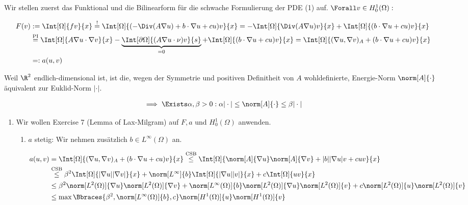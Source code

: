 \begin{solution}

Wir stellen zuerst das Funktional und die Bilinearform für die schwache Formulierung der PDE (1) auf.
$\Forall v \in H_0^1(\Omega):$

\begin{align*}
  F(v)
  & :=
  \Int[\Omega]{f v}{x}
  \stackrel{!}{=}
  \Int[\Omega]{(-\Div(A \nabla u) + b \cdot \nabla u + c u) v}{x}
  =
  -\Int[\Omega]{\Div(A \nabla u) v}{x}
  +
  \Int[\Omega]{(b \cdot \nabla u + c u) v}{x} \\
  & \stackrel
  {
    \mathrm{PI}
  }{=}
  \Int[\Omega]{A \nabla u \cdot \nabla v}{x}
  -
  \underbrace
  {
    \Int[\partial \Omega]{(A \nabla u \cdot \nu) v}{s}
  }_{=0}
  +
  \Int[\Omega]{(b \cdot \nabla u + c u) v}{x}
  =
  \Int[\Omega]{(\nabla u, \nabla v)_A + (b \cdot \nabla u + c u) v}{x} \\
  & =:
  a(u, v)
\end{align*}

Weil $\R^2$ endlich-dimensional ist, ist die, wegen der Symmetrie und positiven Definitheit von $A$ wohldefinierte, Energie-Norm $\norm[A]{\cdot}$ äquivalent zur Euklid-Norm $|\cdot|$.

\begin{align*}
  \implies
  \Exists \alpha, \beta > 0:
  \alpha |\cdot| \leq \norm[A]{\cdot} \leq \beta |\cdot|
\end{align*}

\begin{enumerate}[label = \textbf{\alph*)}]

  \item Wir wollen Exercise 7 (Lemma of Lax-Milgram) auf $F, a$ und $H_0^1(\Omega)$ anwenden.

  \begin{enumerate}[label = \arabic*.]

    \item $a$ stetig: Wir nehmen zusätzlich $b \in L^{\infty}(\Omega)$ an.

    \begin{align*}
      a(u, v)
      & =
      \Int[\Omega]{(\nabla u, \nabla v)_A + (b \cdot \nabla u + c u) v}{x}
      \stackrel
      {
        \mathrm{CSB}
      }{\leq}
      \Int[\Omega]{\norm[A]{\nabla u} \norm[A]{\nabla v} + |b| |\nabla u| v + c u v}{x} \\
      & \stackrel
      {
        \mathrm{CSB}
      }{\leq}
      \beta^2 \Int[\Omega]{|\nabla u| |\nabla v|}{x}
      +
      \norm[L^\infty]{b} \Int[\Omega]{|\nabla u| |v|}{x}
      +
      c \Int[\Omega]{u v}{x} \\
      & \leq
      \beta^2 \norm[L^2(\Omega)]{\nabla u} \norm[L^2(\Omega)]{\nabla v}
      +
      \norm[L^\infty(\Omega)]{b} \norm[L^2(\Omega)]{\nabla u} \norm[L^2(\Omega)]{v}
      +
      c \norm[L^2(\Omega)]{u} \norm[L^2(\Omega)]{v} \\
      & \leq
      \max \Bbraces{\beta^2, \norm[L^\infty(\Omega)]{b}, c} \norm[H^1(\Omega)]{u} \norm[H^1(\Omega)]{v}
    \end{align*}


\end{enumerate}
\end{enumerate}
\end{solution}

